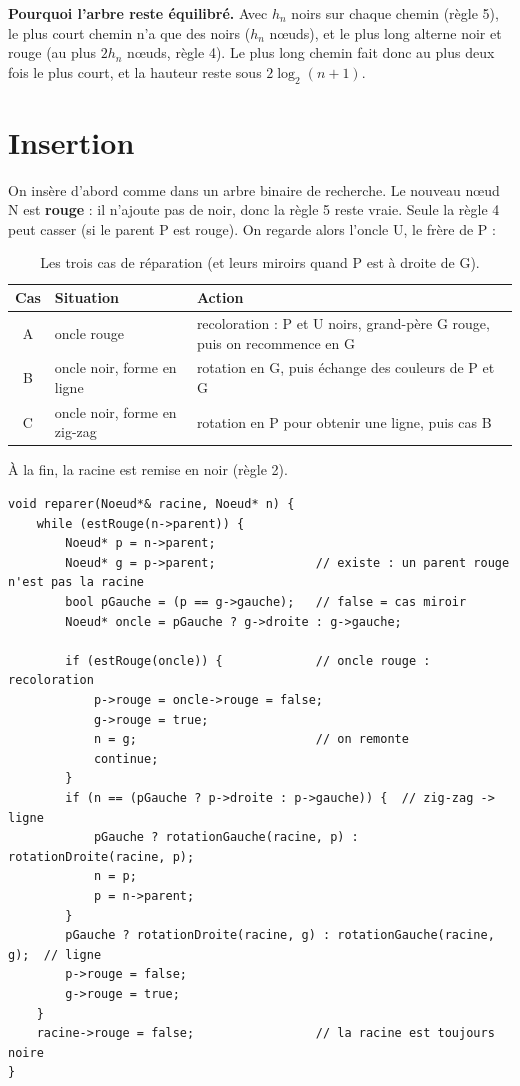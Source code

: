 \documentclass[11pt,a4paper]{article}
\begin{document}
\textbf{Pourquoi l'arbre reste équilibré.} Avec $h_n$ noirs sur chaque chemin (règle 5), le
plus court chemin n'a que des noirs ($h_n$ nœuds), et le plus long alterne noir et rouge
(au plus $2h_n$ nœuds, règle 4). Le plus long chemin fait donc au plus deux fois le plus
court, et la hauteur reste sous $2\log_2(n+1)$.

\section{Insertion}

On insère d'abord comme dans un arbre binaire de recherche. Le nouveau nœud N est
\textbf{rouge} : il n'ajoute pas de noir, donc la règle 5 reste vraie. Seule la règle 4
peut casser (si le parent P est rouge). On regarde alors l'oncle U, le frère de P :

\begin{table}[H]
\centering
\begin{tabular}{|c|p{4.6cm}|p{8.6cm}|}
\hline
\textbf{Cas} & \textbf{Situation} & \textbf{Action} \\
\hline
A & oncle rouge & recoloration : P et U noirs, grand-père G rouge, puis on recommence en G \\
\hline
B & oncle noir, forme en ligne & rotation en G, puis échange des couleurs de P et G \\
\hline
C & oncle noir, forme en zig-zag & rotation en P pour obtenir une ligne, puis cas B \\
\hline
\end{tabular}
\caption{Les trois cas de réparation (et leurs miroirs quand P est à droite de G).}
\end{table}

À la fin, la racine est remise en noir (règle 2).

\begin{lstlisting}[caption={Réparation après insertion (\texttt{14\_arbre\_rouge\_noir.cpp}).}]
void reparer(Noeud*& racine, Noeud* n) {
    while (estRouge(n->parent)) {
        Noeud* p = n->parent;
        Noeud* g = p->parent;              // existe : un parent rouge n'est pas la racine
        bool pGauche = (p == g->gauche);   // false = cas miroir
        Noeud* oncle = pGauche ? g->droite : g->gauche;

        if (estRouge(oncle)) {             // oncle rouge : recoloration
            p->rouge = oncle->rouge = false;
            g->rouge = true;
            n = g;                         // on remonte
            continue;
        }
        if (n == (pGauche ? p->droite : p->gauche)) {  // zig-zag -> ligne
            pGauche ? rotationGauche(racine, p) : rotationDroite(racine, p);
            n = p;
            p = n->parent;
        }
        pGauche ? rotationDroite(racine, g) : rotationGauche(racine, g);  // ligne
        p->rouge = false;
        g->rouge = true;
    }
    racine->rouge = false;                 // la racine est toujours noire
}
\end{lstlisting}
\end{document}
